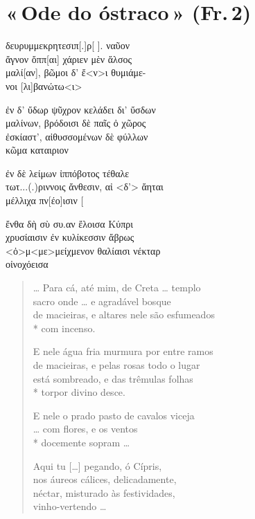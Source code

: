 \pagebreak
\section{«\,Ode do óstraco\,» (Fr.\,2)}

\begin{gkverse}
\dagger{}δευρυμμεκρητεσιπ[.]ρ[ \quad].\dagger{} ναῦον\\
ἄγνον ὄππ[αι\quad] χάριεν μὲν ἄλσος\\
μαλί[αν], βῶμοι δ’ ἔ<ν>ι θυμιάμε-\\
νοι [λι]βανώτω<ι>

ἐν δ’ ὔδωρ ψῦχρον κελάδει δι’ ὔσδων\\
μαλίνων, βρόδοισι δὲ παῖς ὀ χῶρος\\
ἐσκίαστ’, αἰθυσσομένων δὲ φύλλων\\
κῶμα \dagger{}καταιριον

ἐν δὲ λείμων ἰππόβοτος τέθαλε\\
\dagger{}τωτ...(.)ριννοις\dagger{} ἄνθεσιν, αἰ <δ’> ἄηται\\
μέλλιχα πν[έο]ισιν [\\
\quad[\qquad\qquad]

ἔνθα δὴ σὺ \dagger{}συ.αν\dagger{} ἔλοισα Κύπρι\\
χρυσίαισιν ἐν κυλίκεσσιν ἄβρως\\
<ὀ>μ<με>μείχμενον θαλίαισι νέκταρ\\
οἰνοχόεισα
\end{gkverse}

\begin{verse}
\ldots{} Para cá, até mim, de Creta \ldots{} templo\\
sacro onde \ldots{} e agradável bosque\\
de macieiras, e altares nele são esfumeados\\*
com incenso.

E nele água fria murmura por entre ramos\\
de macieiras, e pelas rosas todo o lugar\\
está sombreado, e das trêmulas folhas\\*
torpor divino desce.

E nele o prado pasto de cavalos viceja\\
\ldots{} com flores, e os ventos\\*
docemente sopram \ldots{}

Aqui tu [\ldots{}] pegando, ó Cípris,\\ \EP[1]
nos áureos cálices, delicadamente,\\
néctar, misturado às festividades,\\
vinho-vertendo \ldots{}
\end{verse}


